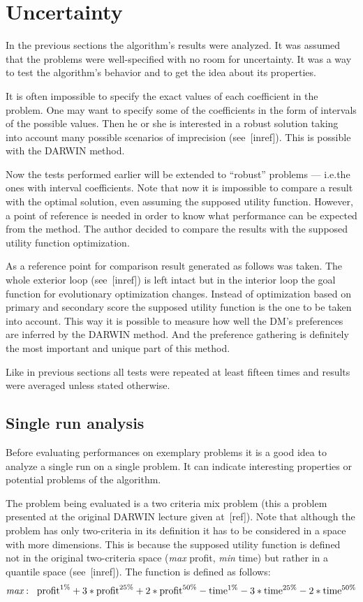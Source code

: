 \section{Uncertainty}
In the previous sections the algorithm's results were analyzed. It was assumed
that the problems were well-specified with no room for uncertainty. It was a
way to test the algorithm's behavior and to get the idea about its properties.

It is often impossible to specify the exact values of each coefficient in the
problem. One may want to specify some of the coefficients in the form of
intervals of the possible values. Then he or she is interested in a robust
solution taking into account many possible scenarios of imprecision
(see~[inref]). This is possible with the DARWIN method.

Now the tests performed earlier will be extended to ``robust'' problems ---
i.e.the ones with interval coefficients. Note that now it is impossible to
compare a result with the optimal solution, even assuming the supposed utility
function. However, a point of reference is needed in order to know what
performance can be expected from the method. The author decided to compare the
results with the supposed utility function optimization.

As a reference point for comparison result generated as follows was taken. The
whole exterior loop (see~[inref]) is left intact but in the interior loop the
goal function for evolutionary optimization changes. Instead of optimization
based on primary and secondary score the supposed utility function is the one
to be taken into account. This way it is possible to measure how well the DM's
preferences are inferred by the DARWIN method. And the preference gathering is
definitely the most important and unique part of this method.

Like in previous sections all tests were repeated at least fifteen times and
results were averaged unless stated otherwise.

\subsection{Single run analysis}
Before evaluating performances on exemplary problems it is a good idea to
analyze a single run on a single problem. It can indicate interesting
properties or potential problems of the algorithm.

The problem being evaluated is a two criteria mix problem (this a problem
presented at the original DARWIN lecture given at~[ref]). Note that although
the problem has only two-criteria in its definition it has to be considered in
a space with more dimensions. This is because the supposed utility function is
defined not in the original two-criteria space (\textit{max} profit,
\textit{min} time) but rather in a quantile space (see~[inref]). The function
is defined as follows:
\begin{equation*}
\textit{max}: \hspace{0.2cm} \text{profit}^{1\%} + 3 * \text{profit}^{25\%} +
2 * \text{profit}^{50\%} - \text{time}^{1\%} - 3 * \text{time}^{25\%} - 2 *
\text{time}^{50\%}
\end{equation*}

